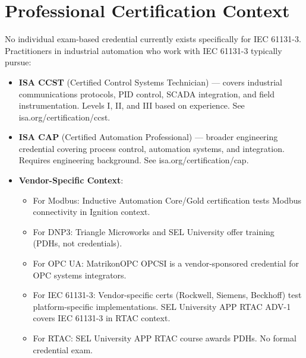 \documentclass[12pt,twoside,openright]{memoir}
\begin{document}
\section{Professional Certification Context}

No individual exam-based credential currently exists specifically for IEC 61131-3. Practitioners in industrial automation who work with IEC 61131-3 typically pursue:

\begin{itemize}
\item \textbf{ISA CCST} (Certified Control Systems Technician) --- covers industrial communications protocols, PID control, SCADA integration, and field instrumentation. Levels I, II, and III based on experience. See isa.org/certification/ccst.
\item \textbf{ISA CAP} (Certified Automation Professional) --- broader engineering credential covering process control, automation systems, and integration. Requires engineering background. See isa.org/certification/cap.
\item \textbf{Vendor-Specific Context}:
  \begin{itemize}
  \item For Modbus: Inductive Automation Core/Gold certification tests Modbus connectivity in Ignition context.
  \item For DNP3: Triangle Microworks and SEL University offer training (PDHs, not credentials).
  \item For OPC UA: MatrikonOPC OPCSI is a vendor-sponsored credential for OPC systems integrators.
  \item For IEC 61131-3: Vendor-specific certs (Rockwell, Siemens, Beckhoff) test platform-specific implementations. SEL University APP RTAC ADV-1 covers IEC 61131-3 in RTAC context.
  \item For RTAC: SEL University APP RTAC course awards PDHs. No formal credential exam.
  \end{itemize}
\end{itemize}
\end{document}
